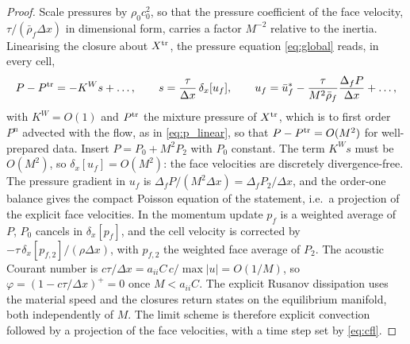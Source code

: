 \begin{proof}
Scale pressures by $\rho_0c_0^2$, so that the pressure coefficient of the face velocity, $\tau/(\bar\rho_f\Delta x)$ in dimensional form, carries a
factor $M^{-2}$ relative to the inertia. Linearising the closure about $X^{\rm tr}$, the pressure equation \eqref{eq:global} reads, in every cell,
\[
P-P^{\rm tr}=-K^Ws+\dots,\qquad s=\frac\tau{\Delta x}\,\delta_x[u_f],\qquad u_f=\bar u^*_f-\frac{\tau}{M^2\bar\rho_f}\frac{\Delta_fP}{\Delta x}+\dots,
\]
with $K^W=O(1)$ and $P^{\rm tr}$ the mixture pressure of $X^{\rm tr}$, which is to first order $P^n$ advected with the flow, as in
\eqref{eq:p_linear}, so that $P-P^{\rm tr}=O(M^2)$ for well-prepared data. Insert $P=P_0+M^2P_2$ with $P_0$ constant. The term
$K^Ws$ must be $O(M^2)$, so $\delta_x[u_f]=O(M^2)$: the face velocities are discretely
divergence-free. The pressure gradient in $u_f$ is $\Delta_fP/(M^2\Delta x)=\Delta_fP_2/\Delta x$, and the order-one balance gives the compact Poisson
equation of the statement, i.e.\ a projection of the explicit face velocities. In the momentum update $p_f$ is a weighted average of
$P$, $P_0$ cancels in $\delta_x[p_f]$, and the cell velocity is corrected by $-\tau\,\delta_x[p_{f,2}]/(\rho\Delta x)$, with $p_{f,2}$ the weighted face
average of $P_2$. The acoustic Courant number is
$c\tau/\Delta x=a_{ii}C\,c/\max|u|=O(1/M)$, so $\varphi=(1-c\tau/\Delta x)^+=0$ once $M<a_{ii}C$. The explicit Rusanov dissipation uses the material
speed and the closures return states on the equilibrium manifold, both independently of $M$. The limit scheme is therefore
explicit convection followed by a projection of the face velocities, with a time step set by \eqref{eq:cfl}.
\end{proof}

